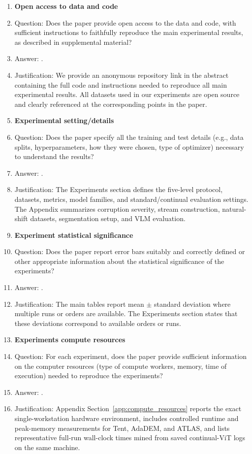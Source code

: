 \begin{enumerate}
\item {\bf Open access to data and code}
    \item[] Question: Does the paper provide open access to the data and code, with sufficient instructions to faithfully reproduce the main experimental results, as described in supplemental material?
    \item[] Answer: \answerYes{}.
    \item[] Justification: We provide an anonymous repository link in the abstract containing the full
code and instructions needed to reproduce all main experimental results. All datasets used
in our experiments are open source and clearly referenced at the corresponding points in the
paper.

\item {\bf Experimental setting/details}
    \item[] Question: Does the paper specify all the training and test details (e.g., data splits, hyperparameters, how they were chosen, type of optimizer) necessary to understand the results?
    \item[] Answer: \answerYes{}.
    \item[] Justification: The Experiments section defines the five-level protocol, datasets, metrics, model families, and standard/continual evaluation settings. The Appendix summarizes corruption severity, stream construction, natural-shift datasets, segmentation setup, and VLM evaluation.

\item {\bf Experiment statistical significance}
    \item[] Question: Does the paper report error bars suitably and correctly defined or other appropriate information about the statistical significance of the experiments?
    \item[] Answer: \answerYes{}.
    \item[] Justification: The main tables report mean $\pm$ standard deviation where multiple runs or orders are available. The Experiments section states that these deviations correspond to available orders or runs.

\item {\bf Experiments compute resources}
    \item[] Question: For each experiment, does the paper provide sufficient information on the computer resources (type of compute workers, memory, time of execution) needed to reproduce the experiments?
    \item[] Answer: \answerYes{}.
    \item[] Justification: Appendix Section~\ref{app:compute_resources} reports the exact single-workstation hardware environment, includes controlled runtime and peak-memory measurements for Tent, AdaDEM, and ATLAS, and lists representative full-run wall-clock times mined from saved continual-ViT logs on the same machine.


\end{enumerate}
